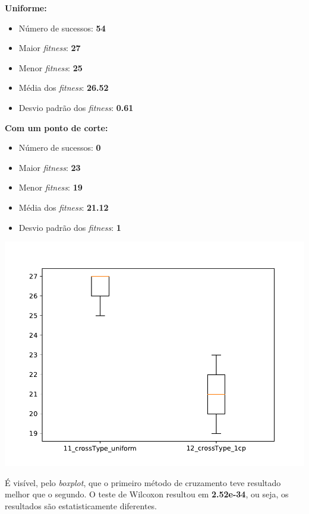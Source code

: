 \documentclass[11pt,a4paper]{article}
\begin{document}
\begin{minipage}{0.5\linewidth}
\textbf{Uniforme:}
\begin{itemize}
	\footnotesize
	\setlength\itemsep{0em}
	\item Número de sucessos: \textbf{54}
	\item Maior \textit{fitness}: \textbf{27}
	\item Menor \textit{fitness}: \textbf{25}
	\item Média dos \textit{fitness}: \textbf{26.52}
	\item Desvio padrão dos \textit{fitness}: \textbf{0.61}
\end{itemize}
\end{minipage}
\begin{minipage}{0.5\linewidth}
\textbf{Com um ponto de corte:}
\begin{itemize}
	\footnotesize
	\setlength\itemsep{0em}
	\item Número de sucessos: \textbf{0}
	\item Maior \textit{fitness}: \textbf{23}
	\item Menor \textit{fitness}: \textbf{19}
	\item Média dos \textit{fitness}: \textbf{21.12}
	\item Desvio padrão dos \textit{fitness}: \textbf{1}
\end{itemize}
\end{minipage}

\begin{minipage}{0.5\linewidth}
\includegraphics[scale=0.5]{teste1.pdf} 
\end{minipage}
\begin{minipage}{0.5\linewidth}
É visível, pelo \textit{boxplot}, que o primeiro método de cruzamento teve resultado melhor que o segundo. O teste de Wilcoxon resultou em \mbox{\textbf{2.52e-34}}, ou seja, os resultados são estatisticamente diferentes.
\end{minipage}
\end{document}
